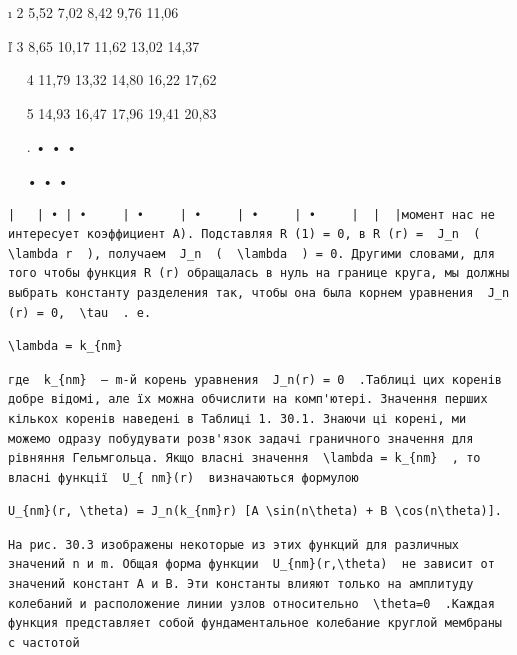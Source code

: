\documentclass[
  ukrainian,
]{article}
\begin{document}
ı \textbar{} 2 \textbar{} 5,52 \textbar{} 7,02 \textbar{} 8,42
\textbar{} 9,76 \textbar{} 11,06 \textbar{} \textbar{} \textbar{}

ľ \textbar{} 3 \textbar{} 8,65 \textbar{} 10,17 \textbar{} 11,62
\textbar{} 13,02 \textbar{} 14,37 \textbar{} \textbar{} \textbar{}

~~\textbar{} 4 \textbar{} 11,79 \textbar{} 13,32 \textbar{} 14,80
\textbar{} 16,22 \textbar{} 17,62 \textbar{} \textbar{} \textbar{}

~~\textbar{} 5 \textbar{} 14,93 \textbar{} 16,47 \textbar{} 17,96
\textbar{} 19,41 \textbar{} 20,83 \textbar{} \textbar{} \textbar{}

~~\textbar{} . \textbar{} • \textbar{} \textbar{} • \textbar{}
\textbar{} • \textbar{} \textbar{} \textbar{}

~~\textbar{} \textbar{} \textbar{} • \textbar{} \textbar{} • \textbar{}
• \textbar{} \textbar{} \textbar{}

\begin{verbatim}
|   | • | •     | •     | •     | •     | •     |  |  |момент нас не интересует коэффициент A). Подставляя R (1) = 0, в R (r) =  J_n  (  \lambda r  ), получаем  J_n  (  \lambda  ) = 0. Другими словами, для того чтобы функция R (r) обращалась в нуль на границе круга, мы должны выбрать константу разделения так, чтобы она была корнем уравнения  J_n  (r) = 0,  \tau  . e.
\end{verbatim}

\begin{verbatim}
\lambda = k_{nm}
\end{verbatim}

\begin{verbatim}
где  k_{nm}  — m-й корень уравнения  J_n(r) = 0  .Таблиці цих коренів добре відомі, але їх можна обчислити на комп'ютері. Значення перших кількох коренів наведені в Таблиці 1. 30.1. Знаючи ці корені, ми можемо одразу побудувати розв'язок задачі граничного значення для рівняння Гельмгольца. Якщо власні значення  \lambda = k_{nm}  , то власні функції  U_{ nm}(r)  визначаються формулою
\end{verbatim}

\begin{verbatim}
U_{nm}(r, \theta) = J_n(k_{nm}r) [A \sin(n\theta) + B \cos(n\theta)].
\end{verbatim}

\begin{verbatim}
На рис. 30.3 изображены некоторые из этих функций для различных значений n и m. Общая форма функции  U_{nm}(r,\theta)  не зависит от значений констант A и B. Эти константы влияют только на амплитуду колебаний и расположение линии узлов относительно  \theta=0  .Каждая функция представляет собой фундаментальное колебание круглой мембраны с частотой
\end{verbatim}
\end{document}
